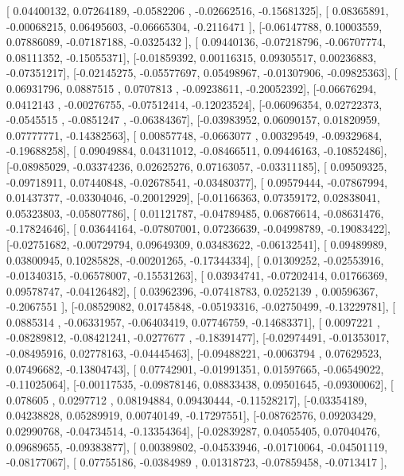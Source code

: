\documentclass{article}
\begin{document}
       [ 0.04400132,  0.07264189, -0.0582206 , -0.02662516, -0.15681325],
       [ 0.08365891, -0.00068215,  0.06495603, -0.06665304, -0.2116471 ],
       [-0.06147788,  0.10003559,  0.07886089, -0.07187188, -0.0325432 ],
       [ 0.09440136, -0.07218796, -0.06707774,  0.08111352, -0.15055371],
       [-0.01859392,  0.00116315,  0.09305517,  0.00236883, -0.07351217],
       [-0.02145275, -0.05577697,  0.05498967, -0.01307906, -0.09825363],
       [ 0.06931796,  0.0887515 ,  0.0707813 , -0.09238611, -0.20052392],
       [-0.06676294,  0.0412143 , -0.00276755, -0.07512414, -0.12023524],
       [-0.06096354,  0.02722373, -0.0545515 , -0.0851247 , -0.06384367],
       [-0.03983952,  0.06090157,  0.01820959,  0.07777771, -0.14382563],
       [ 0.00857748, -0.0663077 ,  0.00329549, -0.09329684, -0.19688258],
       [ 0.09049884,  0.04311012, -0.08466511,  0.09446163, -0.10852486],
       [-0.08985029, -0.03374236,  0.02625276,  0.07163057, -0.03311185],
       [ 0.09509325, -0.09718911,  0.07440848, -0.02678541, -0.03480377],
       [ 0.09579444, -0.07867994,  0.01437377, -0.03304046, -0.20012929],
       [-0.01166363,  0.07359172,  0.02838041,  0.05323803, -0.05807786],
       [ 0.01121787, -0.04789485,  0.06876614, -0.08631476, -0.17824646],
       [ 0.03644164, -0.07807001,  0.07236639, -0.04998789, -0.19083422],
       [-0.02751682, -0.00729794,  0.09649309,  0.03483622, -0.06132541],
       [ 0.09489989,  0.03800945,  0.10285828, -0.00201265, -0.17344334],
       [ 0.01309252, -0.02553916, -0.01340315, -0.06578007, -0.15531263],
       [ 0.03934741, -0.07202414,  0.01766369,  0.09578747, -0.04126482],
       [ 0.03962396, -0.07418783,  0.0252139 ,  0.00596367, -0.2067551 ],
       [-0.08529082,  0.01745848, -0.05193316, -0.02750499, -0.13229781],
       [ 0.0885314 , -0.06331957, -0.06403419,  0.07746759, -0.14683371],
       [ 0.0097221 , -0.08289812, -0.08421241, -0.0277677 , -0.18391477],
       [-0.02974491, -0.01353017, -0.08495916,  0.02778163, -0.04445463],
       [-0.09488221, -0.0063794 ,  0.07629523,  0.07496682, -0.13804743],
       [ 0.07742901, -0.01991351,  0.01597665, -0.06549022, -0.11025064],
       [-0.00117535, -0.09878146,  0.08833438,  0.09501645, -0.09300062],
       [ 0.078605  ,  0.0297712 ,  0.08194884,  0.09430444, -0.11528217],
       [-0.03354189,  0.04238828,  0.05289919,  0.00740149, -0.17297551],
       [-0.08762576,  0.09203429,  0.02990768, -0.04734514, -0.13354364],
       [-0.02839287,  0.04055405,  0.07040476,  0.09689655, -0.09383877],
       [ 0.00389802, -0.04533946, -0.01710064, -0.04501119, -0.08177067],
       [ 0.07755186, -0.0384989 ,  0.01318723, -0.07859458, -0.0713417 ],
\end{document}
